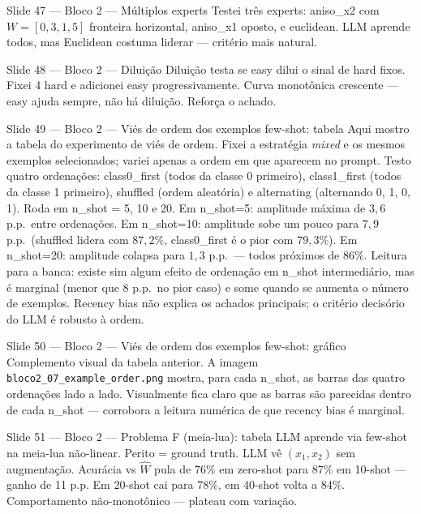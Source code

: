 \documentclass[aspectratio=169,10pt]{beamer}
\begin{document}
\begin{frame}{Slide 47 --- Bloco 2 --- M\'ultiplos experts}
\footnotesize
Testei tr\^es experts: aniso\_x2 com $W=[0{,}3, 1{,}5]$ fronteira horizontal, aniso\_x1 oposto, e euclidean. LLM aprende todos, mas Euclidean costuma liderar --- crit\'erio mais natural.
\end{frame}

\begin{frame}{Slide 48 --- Bloco 2 --- Dilui\c{c}\~ao}
\footnotesize
Dilui\c{c}\~ao testa se easy dilui o sinal de hard fixos. Fixei 4 hard e adicionei easy progressivamente. Curva monot\^onica crescente --- easy ajuda sempre, n\~ao h\'a dilui\c{c}\~ao. Refor\c{c}a o achado.
\end{frame}

\begin{frame}{Slide 49 --- Bloco 2 --- Vi\'es de ordem dos exemplos few-shot: tabela}
\footnotesize
Aqui mostro a tabela do experimento de vi\'es de ordem. Fixei a estrat\'egia \emph{mixed} e os mesmos exemplos selecionados; variei apenas a ordem em que aparecem no prompt. Testo quatro ordena\c{c}\~oes: class0\_first (todos da classe 0 primeiro), class1\_first (todos da classe 1 primeiro), shuffled (ordem aleat\'oria) e alternating (alternando 0, 1, 0, 1). Roda em n\_shot = 5, 10 e 20. Em n\_shot=5: amplitude m\'axima de $3{,}6$ p.p.\ entre ordena\c{c}\~oes. Em n\_shot=10: amplitude sobe um pouco para $7{,}9$ p.p.\ (shuffled lidera com $87{,}2\%$, class0\_first \'e o pior com $79{,}3\%$). Em n\_shot=20: amplitude colapsa para $1{,}3$ p.p.\ --- todos pr\'oximos de $86\%$. Leitura para a banca: existe sim algum efeito de ordena\c{c}\~ao em n\_shot intermedi\'ario, mas \'e marginal (menor que 8 p.p.\ no pior caso) e some quando se aumenta o n\'umero de exemplos. Recency bias n\~ao explica os achados principais; o crit\'erio decis\'orio do LLM \'e robusto \`a ordem.
\end{frame}

\begin{frame}{Slide 50 --- Bloco 2 --- Vi\'es de ordem dos exemplos few-shot: gr\'afico}
\footnotesize
Complemento visual da tabela anterior. A imagem \texttt{bloco2\_07\_example\_order.png} mostra, para cada n\_shot, as barras das quatro ordena\c{c}\~oes lado a lado. Visualmente fica claro que as barras s\~ao parecidas dentro de cada n\_shot --- corrobora a leitura num\'erica de que recency bias \'e marginal.
\end{frame}

\begin{frame}{Slide 51 --- Bloco 2 --- Problema F (meia-lua): tabela}
\footnotesize
LLM aprende via few-shot na meia-lua n\~ao-linear. Perito = ground truth. LLM v\^e $(x_1, x_2)$ sem augmenta\c{c}\~ao. Acur\'acia vs $\hat W$ pula de 76\% em zero-shot para 87\% em 10-shot --- ganho de 11 p.p. Em 20-shot cai para 78\%, em 40-shot volta a 84\%. Comportamento n\~ao-monot\^onico --- plateau com varia\c{c}\~ao.
\end{frame}
\end{document}
